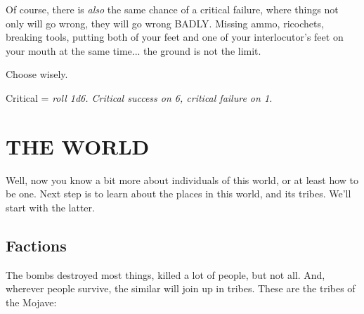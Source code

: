 \documentclass[11pt]{article} %
\begin{document}
Of course, there is \textit{also} the same chance of a critical failure, where things not only will go wrong, they will go wrong BADLY. Missing ammo, ricochets, breaking tools, putting both of your feet and one of your interlocutor's feet on your mouth at the same time... the ground is not the limit.

Choose wisely.

\begin{center}
	Critical = \textit{roll 1d6. Critical success on 6, critical failure on 1.}
\end{center}

\newpage

\section{THE WORLD}

Well, now you know a bit more about individuals of this world, or at least how to be one. Next step is to learn about the places in this world, and its tribes. We'll start with the latter.

\subsection{Factions}

The bombs destroyed most things, killed a lot of people, but not all. And, wherever people survive, the similar will join up in tribes. These are the tribes of the Mojave:
\end{document}
